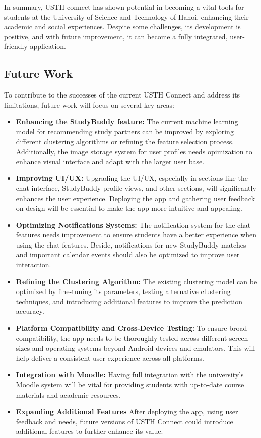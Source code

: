 \documentclass[12pt]{article}
\begin{document}
In summary, USTH connect has shown potential in becoming a vital tools for students at the University of Science and Technology of Hanoi, enhancing their academic and social experiences. 
Despite some challenges, its development is positive, and with future improvement, it can become a fully integrated, user-friendly application.

\subsection{Future Work}
To contribute to the successes of the current USTH Connect and address its limitations, future work will focus on several key areas:
\begin{itemize}
    \item \textbf{Enhancing the StudyBuddy feature: } The current machine learning model for recommending study partners can be improved by exploring different clustering algorithms or refining the feature selection process. Additionally, the image storage system for user profiles needs opimization to enhance visual interface and adapt with the larger user base.
    \item \textbf{Improving UI/UX: } Upgrading the UI/UX, especially in sections like the chat interface, StudyBuddy profile views, and other sections, will significantly enhances the user experience. Deploying the app and gathering user feedback on design will be essential to make the app more intuitive and appealing.
    \item \textbf{Optimizing Notifications Systems: } The notification system for the chat features needs improvement to ensure students have a better experience when using the chat features. Beside, notifications for new StudyBuddy matches and important calendar events should also be optimized to improve user interaction.
    \item \textbf{Refining the Clustering Algorithm: } The existing clustering model can be optimized by fine-tuning its parameters, testing alternative clustering techniques, and introducing additional features to improve the prediction accuracy.
    \item \textbf{Platform Compatibility and Cross-Device Testing: } To ensure broad compatibility, the app needs to be thoroughly tested across different screen sizes and operating systems beyond Android devices and emulators. This will help deliver a consistent user experience across all platforms.
    \item \textbf{Integration with Moodle: } Having full integration with the university's Moodle system will be vital for providing students with up-to-date course materials and academic resources.
    \item \textbf{Expanding Additional Features} After deploying the app, using user feedback and needs, future versions of USTH Connect could introduce additional features to further enhance its value.
\end{itemize}
\end{document}
